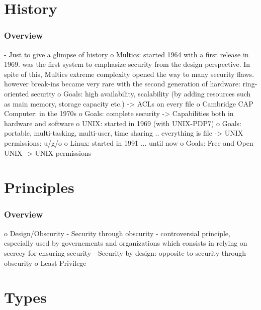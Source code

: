 %
%

\section{History}


\begin{frame}
  \frametitle{Overview}

  - Just to give a glimpse of history
  o Multics: started 1964 with a first release in 1969.
             was the first system to emphasize security from the design perspective. In spite of this,
             Multics extreme complexity opened the way to many security flaws.
             however break-ins became very rare with the second generation of hardware: ring-oriented security
    o Goals: high availability, scalability (by adding resources such as main memory, storage capacity etc.)
             -> ACLs on every file
  o Cambridge CAP Computer: in the 1970s
    o Goals: complete security
             -> Capabilities both in hardware and software
  o UNIX: started in 1969 (with UNIX-PDP7)
    o Goals: portable, multi-tasking, multi-user, time sharing .. everything is file
             -> UNIX permissions: u/g/o
  o Linux: started in 1991 ... until now
    o Goals: Free and Open UNIX
             -> UNIX permissions
\end{frame}

%
%

\section{Principles}


\begin{frame}
  \frametitle{Overview}

  o Design/Obscurity
    - Security through obscurity
        - controversial principle, especially used by governements and organizations which consists in
          relying on secrecy for ensuring security
    - Security by design: opposite to security through obscurity
  o Least Privilege
\end{frame}

%
%

\section{Types}


